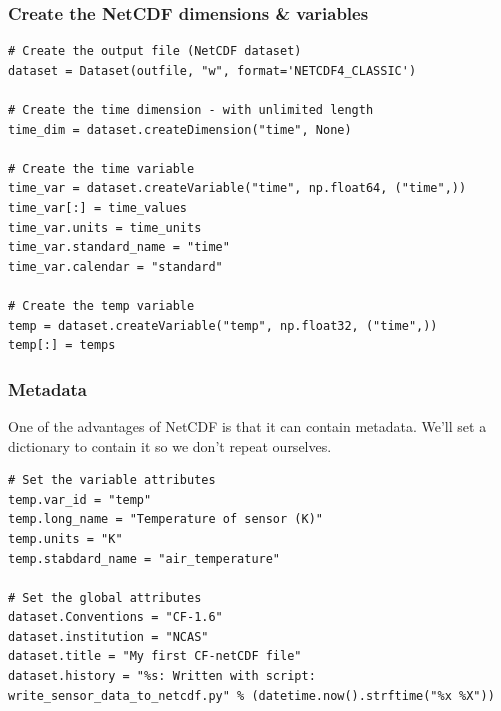 \documentclass[aspectratio=1610,9pt]{beamer} %
\begin{document}
\begin{frame}[fragile]
\frametitle{Create the NetCDF dimensions \& variables}

\begin{verbatim}
# Create the output file (NetCDF dataset)
dataset = Dataset(outfile, "w", format='NETCDF4_CLASSIC')

# Create the time dimension - with unlimited length
time_dim = dataset.createDimension("time", None)

# Create the time variable
time_var = dataset.createVariable("time", np.float64, ("time",))
time_var[:] = time_values
time_var.units = time_units
time_var.standard_name = "time" 
time_var.calendar = "standard" 

# Create the temp variable
temp = dataset.createVariable("temp", np.float32, ("time",))
temp[:] = temps
\end{verbatim}

\end{frame}
\begin{frame}[fragile]
\frametitle{Metadata}

One of the advantages of NetCDF is that it can contain metadata. We'll
set a dictionary to contain it so we don't repeat ourselves.

\begin{verbatim}
# Set the variable attributes
temp.var_id = "temp" 
temp.long_name = "Temperature of sensor (K)" 
temp.units = "K" 
temp.stabdard_name = "air_temperature" 

# Set the global attributes
dataset.Conventions = "CF-1.6" 
dataset.institution = "NCAS" 
dataset.title = "My first CF-netCDF file" 
dataset.history = "%s: Written with script: write_sensor_data_to_netcdf.py" % (datetime.now().strftime("%x %X"))
\end{verbatim}

\end{frame}
\end{document}
